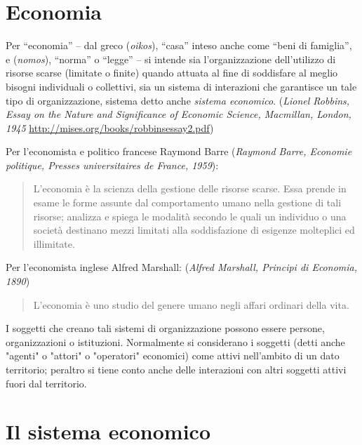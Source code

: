\section{Economia}
\label{sec:modelli_economia}

Per ``economia'' – dal greco %
(\emph{oikos}), ``casa'' inteso anche come ``beni di famiglia'', e %
(\emph{nomos}), ``norma'' o ``legge'' – si intende sia l'organizzazione 
dell'utilizzo di risorse scarse (limitate o finite) quando attuata al 
fine di soddisfare al meglio bisogni individuali o collettivi, sia 
un sistema di interazioni che garantisce un tale tipo di organizzazione, 
sistema detto anche \emph{sistema economico}.
(\emph{Lionel Robbins, Essay on the Nature and Significance of Economic 
Science, Macmillan, London, 1945}
\url{http://mises.org/books/robbinsessay2.pdf})

Per l'economista e politico francese Raymond Barre
(\emph{Raymond Barre, Economie politique, Presses universitaires de France, 
1959}): 
\begin{quote}
 L'economia 
è la scienza della gestione delle risorse scarse. Essa prende in esame le forme 
assunte dal comportamento umano nella gestione di tali risorse; analizza e 
spiega le modalità secondo le quali un individuo o una società destinano mezzi 
limitati alla soddisfazione di esigenze molteplici ed illimitate.
\end{quote}


Per l'economista inglese Alfred Marshall:
(\emph{Alfred Marshall, Principi di Economia, 1890})
\begin{quotation}
 L'economia è uno studio del genere umano negli affari ordinari della vita. 
\end{quotation}

I soggetti che creano tali sistemi di organizzazione possono essere persone, 
organizzazioni o istituzioni. Normalmente si considerano i 
soggetti (detti anche "agenti" o "attori" o "operatori" economici) come attivi 
nell'ambito di un dato territorio; peraltro si tiene conto anche delle 
interazioni con altri soggetti attivi fuori dal territorio.

\section{Il sistema economico}
\label{sec:modelli_sistemaeconomico}

